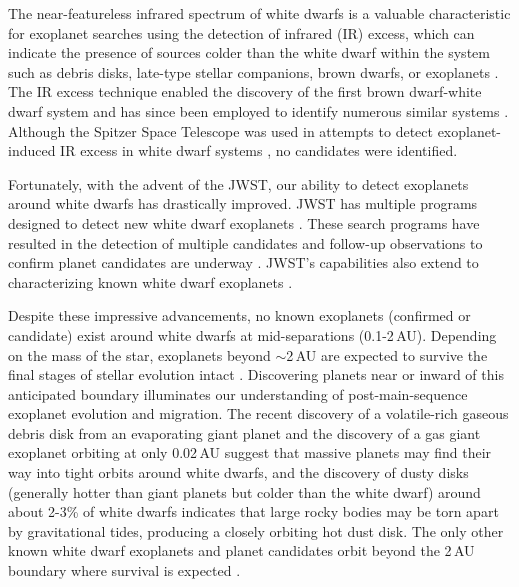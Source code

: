 \documentclass[twocolumn]{aastex631}
\begin{document}
The near-featureless {infrared} spectrum of white dwarfs is a valuable characteristic for exoplanet searches using the detection of infrared (IR) excess, which can indicate the presence of {sources colder than the white dwarf within the system} such as debris disks, late-type stellar companions, brown dwarfs, or exoplanets \citep{2005ApJ...632L.115K,2005ApJ...632L.119B,2008ApJ...674..431F,2012ApJ...760...26B,2020ApJ...898L..35S,Limbach22}. The IR excess technique enabled the discovery of the first brown dwarf-white dwarf system \citep{1987Natur.330..138Z,2022Natur.602..219C} and has since been employed to identify numerous similar systems \citep[e.g., ][]{2011MNRAS.417.1210G, 2015ApJ...806L...5X, 2019MNRAS.489.3990R, 2020MNRAS.498...12H, lai2021infrared}. Although the Spitzer Space Telescope was used in attempts to detect exoplanet-induced IR excess in white dwarf systems \citep{2004ApJS..154....1W, 2007ApJS..171..206M, 2008ApJ...681.1470F, 2010ApJ...708..411K}, no candidates were identified.

Fortunately, with the advent of the JWST, our ability to detect exoplanets around white dwarfs has drastically improved. JWST has multiple programs designed to detect new white dwarf exoplanets \citep{2021jwst.prop.1911M,2023jwst.prop.4403M,2023jwst.prop.3964M}. These search programs have resulted in the detection of multiple candidates \citep[][and {\it this work}]{2024arXiv240113153M} and follow-up observations to confirm planet candidates are underway \citep{2023jwst.prop.3621V,2024jwst.prop.6410C, 2024jwst.prop.4857M}. JWST's capabilities also extend to characterizing known white dwarf exoplanets \citep{2021jwst.prop.2358M,2021jwst.prop.2507V,2024jwst.prop.5204L,2024jwst.prop.6078B}.

Despite these impressive advancements, no known exoplanets (confirmed or candidate) exist around white dwarfs at mid-separations (0.1-2\,AU). Depending on the mass of the star, exoplanets beyond $\sim$2\,AU are expected to survive the final stages of stellar evolution intact \citep{Nordhaus2013MNRAS}. Discovering planets near or inward of this anticipated boundary illuminates our understanding of post-main-sequence exoplanet evolution and migration. The recent discovery of a volatile-rich gaseous debris disk from an evaporating giant planet \citep{2019Natur.576...61G} and the discovery of a gas giant exoplanet orbiting at only 0.02\,AU \citep{Vanderburg_2020} suggest that massive planets may find their way into tight orbits around white dwarfs, and the discovery of dusty disks {(generally hotter than giant planets but colder than the white dwarf)} around about 2-3\% of white dwarfs indicates that large rocky bodies may be torn apart by gravitational tides, producing a closely orbiting hot dust disk. The only other known white dwarf exoplanets and planet candidates orbit beyond the 2\,AU boundary where survival is expected \citep{1993ApJ...412L..33T,2003Sci...301..193S,2011ApJ...730L...9L,2021Natur.598..272B,2024arXiv240113153M}.
\end{document}
